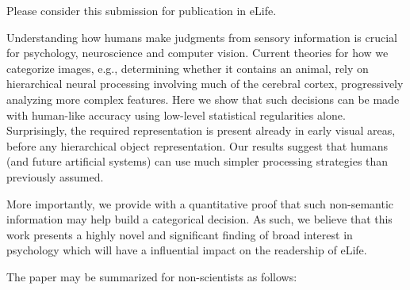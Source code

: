 \documentclass[stdletter,8pt,dateno]{newlfm}%
\newcommand{\Journal}{eLife}%
\begin{document}
\begin{newlfm}

Please consider this submission for publication in \Journal .

Understanding how humans make judgments from sensory information
is crucial for psychology, neuroscience
and computer vision.  Current theories for how we categorize images, e.g.,
determining whether it contains an animal, rely on hierarchical neural
processing involving much of the cerebral cortex, progressively
analyzing more complex features.  Here we show that such decisions can
be made with human-like accuracy using low-level statistical
regularities alone. Surprisingly, the required representation is
present already in early visual areas, before any hierarchical object
representation. Our results suggest that humans (and future artificial
systems) can use much simpler processing strategies than previously
assumed.

More importantly, we provide with a quantitative proof that such non-semantic information may help build a categorical decision. 
As such, we believe that this work presents a highly novel and significant finding of broad interest in psychology
which will have a influential impact on the readership of \Journal .

The paper may be summarized for non-scientists as follows:
\begin{center} \parbox[t]{15cm}{\SignificanceStatement} \end{center}



\end{newlfm}
\end{document}
